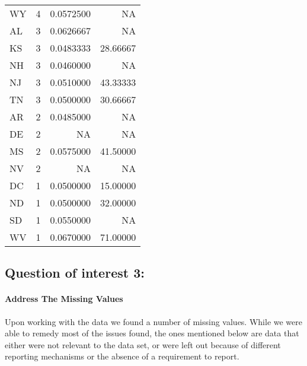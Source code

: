 \documentclass[
]{article}
\begin{document}
\begin{longtable}[]{@{}lrrr@{}}
WY & 4 & 0.0572500 & NA \\
AL & 3 & 0.0626667 & NA \\
KS & 3 & 0.0483333 & 28.66667 \\
NH & 3 & 0.0460000 & NA \\
NJ & 3 & 0.0510000 & 43.33333 \\
TN & 3 & 0.0500000 & 30.66667 \\
AR & 2 & 0.0485000 & NA \\
DE & 2 & NA & NA \\
MS & 2 & 0.0575000 & 41.50000 \\
NV & 2 & NA & NA \\
DC & 1 & 0.0500000 & 15.00000 \\
ND & 1 & 0.0500000 & 32.00000 \\
SD & 1 & 0.0550000 & NA \\
WV & 1 & 0.0670000 & 71.00000 \\
\bottomrule()
\end{longtable}

\hypertarget{question-of-interest-3}{%
\subsection{Question of interest 3:}\label{question-of-interest-3}}

\hypertarget{address-the-missing-values}{%
\paragraph{Address The Missing
Values}\label{address-the-missing-values}}

Upon working with the data we found a number of missing values. While we
were able to remedy most of the issues found, the ones mentioned below
are data that either were not relevant to the data set, or were left out
because of different reporting mechanisms or the absence of a
requirement to report.
\end{document}
